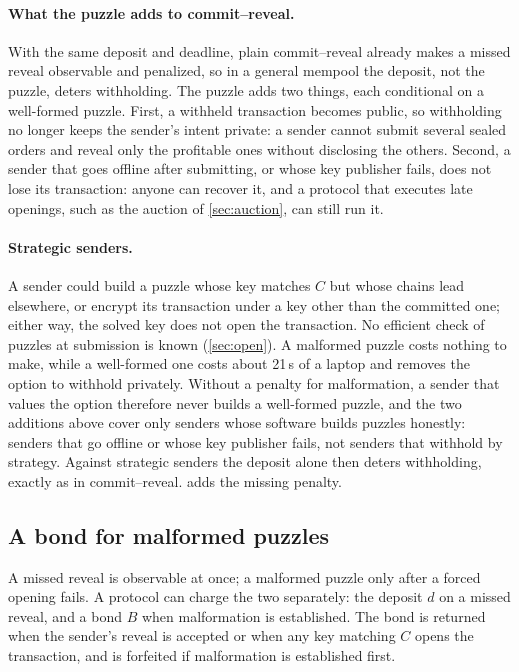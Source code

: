 \paragraph{What the puzzle adds to commit--reveal.}
With the same deposit and deadline, plain commit--reveal already makes a missed reveal observable and penalized, so in a general mempool the deposit, not the puzzle, deters withholding. The puzzle adds two things, each conditional on a well-formed puzzle. First, a withheld transaction becomes public, so withholding no longer keeps the sender's intent private: a sender cannot submit several sealed orders and reveal only the profitable ones without disclosing the others. Second, a sender that goes offline after submitting, or whose key publisher fails, does not lose its transaction: anyone can recover it, and a protocol that executes late openings, such as the auction of \cref{sec:auction}, can still run it.

\paragraph{Strategic senders.}
A sender could build a puzzle whose key matches $C$ but whose chains lead elsewhere, or encrypt its transaction under a key other than the committed one; either way, the solved key does not open the transaction. No efficient check of puzzles at submission is known (\cref{sec:open}). A malformed puzzle costs nothing to make, while a well-formed one costs about 21\,s of a laptop and removes the option to withhold privately. Without a penalty for malformation, a sender that values the option therefore never builds a well-formed puzzle, and the two additions above cover only senders whose software builds puzzles honestly: senders that go offline or whose key publisher fails, not senders that withhold by strategy. Against strategic senders the deposit alone then deters withholding, exactly as in commit--reveal.  adds the missing penalty.

\subsection{A bond for malformed puzzles}\label{sec:bond}

A missed reveal is observable at once; a malformed puzzle only after a forced opening fails. A protocol can charge the two separately: the deposit $d$ on a missed reveal, and a bond $B$ when malformation is established. The bond is returned when the sender's reveal is accepted or when any key matching $C$ opens the transaction, and is forfeited if malformation is established first.

